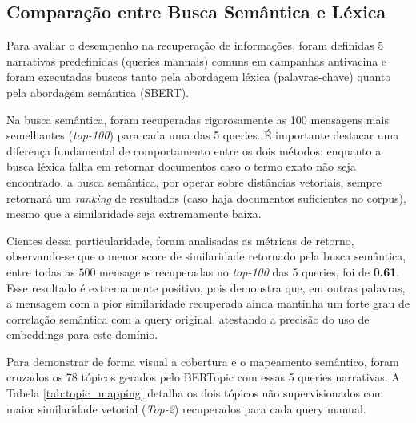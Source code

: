\documentclass[10pt,twocolumn,a4paper]{article}
\begin{document}
\subsection{Comparação entre Busca Semântica e Léxica}

Para avaliar o desempenho na recuperação de informações, foram definidas 5 narrativas predefinidas (queries manuais) comuns em campanhas antivacina e foram executadas buscas tanto pela abordagem léxica (palavras-chave) quanto pela abordagem semântica (SBERT). 

Na busca semântica, foram recuperadas rigorosamente as 100 mensagens mais semelhantes (\textit{top-100}) para cada uma das 5 queries. É importante destacar uma diferença fundamental de comportamento entre os dois métodos: enquanto a busca léxica falha em retornar documentos caso o termo exato não seja encontrado, a busca semântica, por operar sobre distâncias vetoriais, sempre retornará um \textit{ranking} de resultados (caso haja documentos suficientes no corpus), mesmo que a similaridade seja extremamente baixa.

Cientes dessa particularidade, foram analisadas as métricas de retorno, observando-se que o menor score de similaridade retornado pela busca semântica, entre todas as $500$ mensagens recuperadas no \textit{top-100} das 5 queries, foi de \textbf{0.61}. Esse resultado é extremamente positivo, pois demonstra que, em outras palavras, a mensagem com a pior similaridade recuperada ainda mantinha um forte grau de correlação semântica com a query original, atestando a precisão do uso de embeddings para este domínio.

Para demonstrar de forma visual a cobertura e o mapeamento semântico, foram cruzados os 78 tópicos gerados pelo BERTopic com essas 5 queries narrativas. A Tabela \ref{tab:topic_mapping} detalha os dois tópicos não supervisionados com maior similaridade vetorial (\textit{Top-2}) recuperados para cada query manual. 
\end{document}
